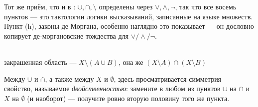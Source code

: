 \begin{intuition}
Тот же приём, что и в : $\cup,\cap,\setminus$ определены
через $\lor,\land,\neg$, так что все восемь пунктов — это тавтологии логики высказываний,
записанные на языке множеств. Пункт (h), законы де Моргана, особенно наглядно это показывает
— он дословно копирует де-моргановские тождества для $\lor/\land/\neg$.

\begin{center}
\\
{\footnotesize\color{intuitiongray}закрашенная область — $X\setminus(A\cup B)$, она же
$(X\setminus A)\cap(X\setminus B)$}
\end{center}
\end{intuition}

\begin{remark}
Между $\cup$ и $\cap$, а также между $X$ и $\emptyset$, здесь просматривается симметрия —
свойство, называемое \emph{двойственностью}: замените в любом из пунктов $\cup$ на
$\cap$ и $X$ на $\emptyset$ (и наоборот) — получите ровно вторую половину того же пункта.
\end{remark}

